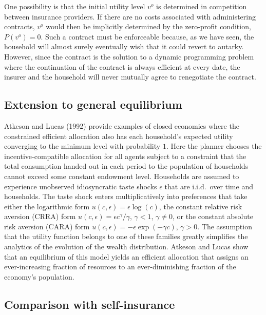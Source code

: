 One possibility is that the initial utility level $v^o$
is determined in competition between insurance
providers. If there are no costs associated with
administering contracts, $v^o$ would then be implicitly determined
by the zero-profit condition, $P(v^o)=0$. Such a contract must be enforceable because, as we have seen,
the household will almost surely eventually wish that it could  revert  to autarky. However, since
the contract is the solution to a dynamic programming
problem where the continuation of the contract is always efficient
at every date, the insurer and
the household will never mutually agree to renegotiate the contract.
\subsection{Extension to general equilibrium}
Atkeson and Lucas (1992)
provide examples of closed economies where the constrained
efficient allocation also has each household's expected utility
converging to the minimum level with probability $1$. Here the
planner chooses the incentive-compatible allocation for all agents
subject to a constraint that the total consumption handed out in
each period to the population of households cannot exceed some
constant endowment level. Households are assumed to experience
unobserved idiosyncratic taste shocks $ \epsilon$ that are i.i.d.\
over time and households. The taste shock enters multiplicatively
into preferences that take either the logarithmic form
$u(c,\epsilon)=\epsilon \log (c)$, the constant relative risk aversion
 (CRRA) form $u(c,\epsilon) = \epsilon c^{\gamma}/\gamma$,
$\gamma<1$, $\gamma \not= 0$, or the constant absolute risk
aversion (CARA) form $u(c,\epsilon) = -\epsilon \exp (-\gamma c)$,
$\gamma>0$. The assumption that the  utility function belongs to
one of these families greatly simplifies the analytics of the
evolution of the wealth distribution.
Atkeson and Lucas show that an equilibrium  of this model yields an efficient
allocation that assigns an ever-increasing fraction of resources to an
ever-diminishing fraction of the economy's population.


\subsection{Comparison with self-insurance}

